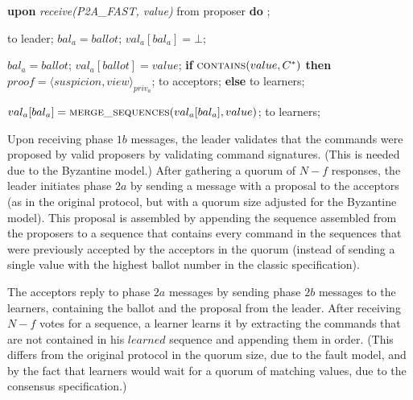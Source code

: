 \begin{algorithm}
\begin{multicols}{2}
\begin{algorithmic}[1]
			\State		
			\State \textbf{upon} \textit{receive(P2A\_FAST, value)} from proposer \textbf{do}
			\State \hspace{\algorithmicindent} ;
			
			\State
			\State {} to leader;
			\State $bal_a = ballot$;	
			\State $val_a[bal_a] = \bot$;	
			\EndIf
			\EndFunction
			
			\State
			\State $bal_a = ballot$;
			\State $val_a[ballot] = value$;
			\State \textbf{if} $\Call{contains}{value, C^*}$ \textbf{then}
			\State \hspace{\algorithmicindent} $proof = \langle suspicion, view \rangle_{priv_a}$;
			\State \hspace{\algorithmicindent}  to acceptors;
			\State \textbf{else}
			\State \hspace{\algorithmicindent} to learners;
			\EndIf
			\EndFunction
			
			\State
			\State $val_a[bal_a] =  \Call{merge\_sequences}{val_a[bal_a], value}$;
			\State {} to learners;
			\EndIf
			\EndFunction
		\end{algorithmic}
	\end{multicols}
	\vspace*{-.4cm}
\end{algorithm}

Upon receiving phase $1b$ messages, the leader validates that the commands were proposed by valid proposers by validating command signatures. (This is needed due to the Byzantine model.)  After gathering a quorum of $N-f$ responses, the leader initiates phase $2a$ by sending a message with a proposal to the acceptors (as in the original protocol, but with a quorum size adjusted for the Byzantine model). This proposal is assembled by appending the sequence assembled from the proposers to a sequence that contains every command in the sequences that were previously accepted by the acceptors in the quorum (instead of sending a single value with the highest ballot number in the classic specification).\par
The acceptors reply to phase $2a$ messages by sending phase $2b$ messages to the learners, containing the ballot and the proposal from the leader. After receiving $N-f$ votes for a sequence, a learner learns it by extracting the commands that are not contained in his $learned$ sequence and appending them in order. (This differs from the original protocol in the quorum size, due to the fault model, and by the fact that learners would wait for a quorum of matching values, due to the consensus specification.)

